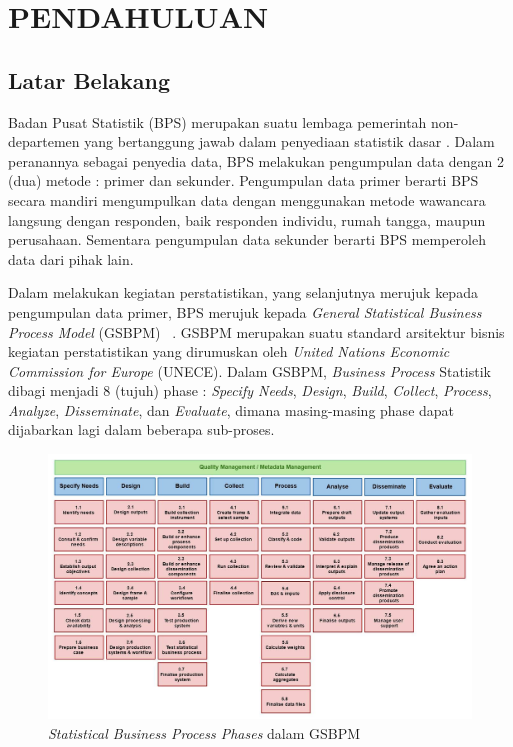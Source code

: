 \chapter{PENDAHULUAN} \label{ch:chapter_1}

\section{Latar Belakang}
Badan Pusat Statistik (BPS) merupakan suatu lembaga pemerintah non-departemen yang bertanggung jawab dalam penyediaan statistik dasar \cite{_badan_????}. Dalam peranannya sebagai penyedia data, BPS melakukan pengumpulan data dengan 2 (dua) metode : primer dan sekunder. Pengumpulan data primer berarti BPS secara mandiri mengumpulkan data dengan menggunakan metode wawancara langsung dengan responden, baik responden individu, rumah tangga, maupun perusahaan. Sementara pengumpulan data sekunder berarti BPS memperoleh data dari pihak lain.

Dalam melakukan kegiatan perstatistikan, yang selanjutnya merujuk kepada pengumpulan data primer, BPS merujuk kepada \textit{General Statistical Business Process Model} (GSBPM) ~\cite{_gsbpm_????}. GSBPM merupakan suatu standard arsitektur bisnis kegiatan perstatistikan yang dirumuskan oleh \textit{United Nations Economic Commission for Europe} (UNECE). Dalam GSBPM, \textit{Business Process} Statistik dibagi menjadi 8 (tujuh) phase : \textit{Specify Needs}, \textit{Design}, \textit{Build}, \textit{Collect}, \textit{Process}, \textit{Analyze}, \textit{Disseminate}, dan \textit{Evaluate}, dimana masing-masing phase dapat dijabarkan lagi dalam beberapa sub-proses.

\begin{figure}
    \centering
    \includegraphics[width=13cm]{../../Resources/Images/gsbpm}
    \caption{\textit{Statistical Business Process Phases} dalam GSBPM}
    \label{fig:gsbpm}
\end{figure}


